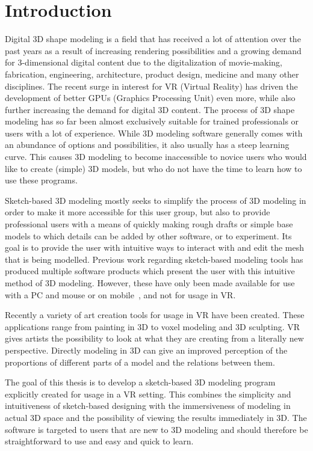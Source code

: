 \setcounter{chapter}{0}

\chapter{Introduction}
\label{chap:intro}
Digital 3D shape modeling is a field that has received a lot of attention over the past years as a result of increasing rendering possibilities and a growing demand for 3-dimensional digital content due to the digitalization of movie-making, fabrication, engineering, architecture, product design, medicine and many other disciplines. The recent surge in interest for VR (Virtual Reality) has driven the development of better GPUs (Graphics Processing Unit) even more, while also further increasing the demand for digital 3D content. 
The process of 3D shape modeling has so far been almost exclusively suitable for trained professionals or users with a lot of experience. While 3D modeling software generally comes with an abundance of options and possibilities, it also usually has a steep learning curve. This causes 3D modeling to become inaccessible to novice users who would like to create (simple) 3D models, but who do not have the time to learn how to use these programs. 

Sketch-based 3D modeling mostly seeks to simplify the process of 3D modeling in order to make it more accessible for this user group, but also to provide professional users with a means of quickly making rough drafts or simple base models to which details can be added by other software, or to experiment. Its goal is to provide the user with intuitive ways to interact with and edit the mesh that is being modelled. Previous work regarding sketch-based modeling tools has produced multiple software products which present the user with this intuitive method of 3D modeling. However, these have only been made available for use with a PC and mouse or on mobile~\cite{GravitySketch}, and not for usage in VR. 

Recently a variety of art creation tools for usage in VR have been created. These applications range from painting in 3D to voxel modeling and 3D sculpting. VR gives artists the possibility to look at what they are creating from a literally new perspective. Directly modeling in 3D can give an improved perception of the proportions of different parts of a model and the relations between them.

The goal of this thesis is to develop a sketch-based 3D modeling program explicitly created for usage in a VR setting. This combines the simplicity and intuitiveness of sketch-based designing with the immersiveness of modeling in actual 3D space and the possibility of viewing the results immediately in 3D. The software is targeted to users that are new to 3D modeling and should therefore be straightforward to use and easy and quick to learn.

